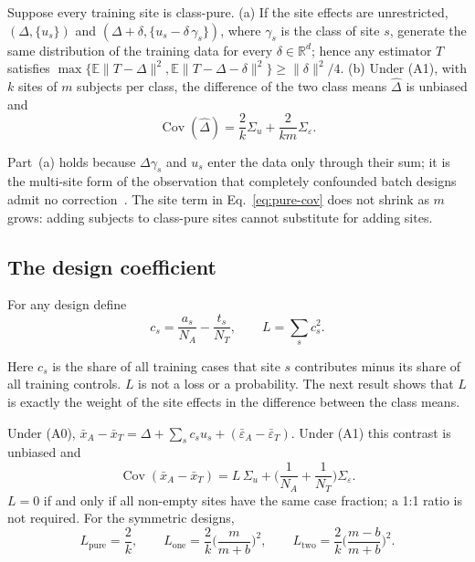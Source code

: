 \begin{proposition}\label{prop:pure}
Suppose every training site is class-pure.
(a) If the site effects are unrestricted, $(\Delta,\{u_s\})$ and $(\Delta+\delta,\{u_s-\delta\,\gamma_s\})$, where $\gamma_s$ is the class of site $s$, generate the same distribution of the training data for every $\delta\in\mathbb{R}^d$; hence any estimator $T$ satisfies $\max\{\mathbb{E}\|T-\Delta\|^2,\mathbb{E}\|T-\Delta-\delta\|^2\}\ge\|\delta\|^2/4$.
(b) Under (A1), with $k$ sites of $m$ subjects per class, the difference of the two class means $\hat\Delta$ is unbiased and
\begin{equation}
\operatorname{Cov}(\hat\Delta)=\frac{2}{k}\Sigma_u+\frac{2}{km}\Sigma_\varepsilon .\label{eq:pure-cov}
\end{equation}
\end{proposition}
Part~(a) holds because $\Delta\gamma_s$ and $u_s$ enter the data only through their sum; it is the multi-site form of the observation that completely confounded batch designs admit no correction~\cite{song2020}. The site term in Eq.~\eqref{eq:pure-cov} does not shrink as $m$ grows: adding subjects to class-pure sites cannot substitute for adding sites.

\subsection{The design coefficient}\label{sec:prop2}

For any design define
\begin{equation}
c_s=\frac{a_s}{N_A}-\frac{t_s}{N_T},\qquad L=\sum_s c_s^2 .\label{eq:L}
\end{equation}

Here $c_s$ is the share of all training cases that site $s$ contributes minus its share of all training controls. $L$ is not a loss or a probability. The next result shows that $L$ is exactly the weight of the site effects in the difference between the class means.

\begin{proposition}\label{prop:L}
Under (A0), $\bar x_A-\bar x_T=\Delta+\sum_s c_su_s+(\bar\varepsilon_A-\bar\varepsilon_T)$. Under (A1) this contrast is unbiased and
\begin{equation}
\operatorname{Cov}(\bar x_A-\bar x_T)=L\,\Sigma_u+\Big(\frac1{N_A}+\frac1{N_T}\Big)\Sigma_\varepsilon .\label{eq:L-cov}
\end{equation}
$L=0$ if and only if all non-empty sites have the same case fraction; a 1:1 ratio is not required. For the symmetric designs,
\begin{equation}
L_{\mathrm{pure}}=\frac2k,\qquad
L_{\mathrm{one}}=\frac2k\Big(\frac{m}{m+b}\Big)^2,\qquad
L_{\mathrm{two}}=\frac2k\Big(\frac{m-b}{m+b}\Big)^2 .\label{eq:L-special}
\end{equation}
\end{proposition}

